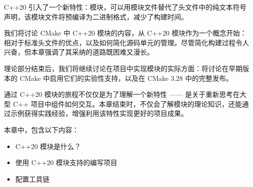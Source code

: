 C++20 引入了一个新特性：模块，可以用模块文件替代了头文件中的纯文本符号声明，该模块文件将预编译为二进制格式，减少了构建时间。

我们将讨论 CMake 中 C++20 模块的内容，从 C++20 模块作为一个概念开始：相对于标准头文件的优点，以及如何简化源码单元的管理。尽管简化构建过程令人兴奋，但本章强调了其采纳的道路既困难又漫长。

理论部分结束后，我们将继续讨论在项目中实现模块的实际方面：将讨论在早期版本的 CMake 中启用它们的实验性支持，以及在 CMake 3.28 中的完整发布。

通过 C++20 模块的旅程不仅仅是为了理解一个新特性 —— 是关于重新思考在大型 C++ 项目中组件如何交互。本章结束时，不仅会了解模块的理论知识，还能通过示例获得实践经验，增强利用该特性实现更好的项目成果。

本章中，包含以下内容：

\begin{itemize}
\item
C++20 模块是什么？

\item
使用 C++20 模块支持的编写项目

\item
配置工具链
\end{itemize}















